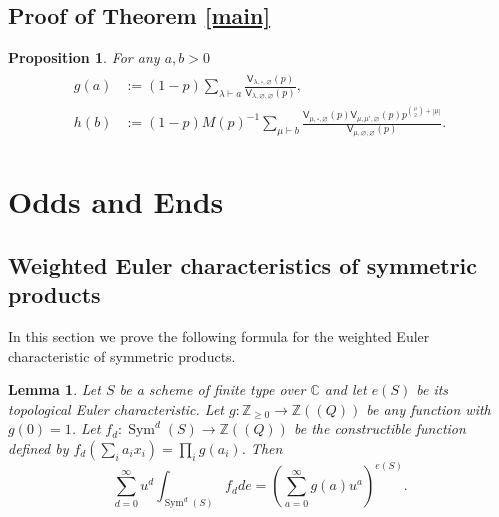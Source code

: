 \documentclass{amsart}
\newtheorem{proposition}[theorem]{Proposition}
\newtheorem{lemma}[theorem]{Lemma}
\theoremstyle{definition}
\newcommand{\CC} {\mathbb{C}}          %
\newcommand{\ZZ} {\mathbb{Z}}		%
\newcommand{\sfV}{\mathsf{V}}
\newcommand{\Sym}{\operatorname{Sym}}
\begin{document}
\subsection{Proof of Theorem \ref{main}}

\begin{proposition}
For any $a,b>0$ 
\begin{align}
\begin{split} \label{gh}
g(a) &:= (1-p) \sum_{\lambda \vdash a} \frac{\sfV_{\lambda,\square,\varnothing}(p)}{\sfV_{\lambda,\varnothing,\varnothing}(p)}, \\
h(b) &:= (1-p)M(p)^{-1} \sum_{\mu \vdash b} \frac{\sfV_{\mu,\square,\varnothing}(p) \sfV_{\mu,\mu',\varnothing}(p) p^{\binom{\mu}{2} + |\mu|}}{\sfV_{\mu,\varnothing,\varnothing}(p)}.
\end{split}
\end{align}
\end{proposition}


\appendix
\section{Odds and Ends}\label{appendix: odds and ends}


\subsection{Weighted Euler characteristics of symmetric products}

In this section we prove the following formula for the weighted Euler
characteristic of symmetric products.

\begin{lemma}\label{lem: formula for euler char of sym products}
Let $S$ be a scheme of finite type over $\CC $ and let $e (S)$ be its
topological Euler characteristic. Let $g:\ZZ _{\geq 0}\to \ZZ ((Q))$
be any function with $g (0)=1$. Let $f_{d}:\Sym ^{d} (S)\to \ZZ ((Q))$
be the constructible function defined by $f_{d} (\sum_{i}
a_{i}x_{i})=\prod _{i}g (a_{i})$. Then
\[
\sum _{d=0}^{\infty } u^{d} \int _{\Sym ^{d} (S)} f_{d} de =
\left(\sum _{a=0}^{\infty }g (a) u^{a} \right)^{e (S)}.
\]
\end{lemma}
\end{document}
